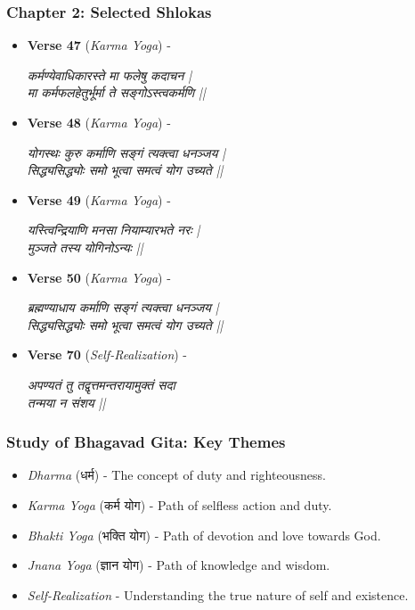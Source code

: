\begin{frame}[fragile]\frametitle{Chapter 2: Selected Shlokas}

      \begin{itemize}
		\item \textbf{Verse 47} (\textit{Karma Yoga}) - 
		
			\textit{कर्मण्येवाधिकारस्ते मा फलेषु कदाचन |} \\
			\textit{मा कर्मफलहेतुर्भूर्मा ते सङ्गोऽस्त्वकर्मणि ||}
		
		\item \textbf{Verse 48} (\textit{Karma Yoga}) - 
		
			\textit{योगस्थः कुरु कर्माणि सङ्गं त्यक्त्वा धनञ्जय |} \\
			\textit{सिद्ध्यसिद्ध्योः समो भूत्वा समत्वं योग उच्यते ||}
		
		\item \textbf{Verse 49} (\textit{Karma Yoga}) - 
		
			\textit{यस्त्विन्द्रियाणि मनसा नियाम्यारभते नरः |} \\
			\textit{मुञ्जते तस्य योगिनोऽन्यः ||}
		
		\item \textbf{Verse 50} (\textit{Karma Yoga}) - 
		
			\textit{ब्रह्मण्याधाय कर्माणि सङ्गं त्यक्त्वा धनञ्जय |} \\
			\textit{सिद्ध्यसिद्ध्योः समो भूत्वा समत्वं योग उच्यते ||}
		
		\item \textbf{Verse 70} (\textit{Self-Realization}) - 
		
			\textit{अपण्यतं तु तद्वृत्तमन्तरायामुक्तं सदा} \\
			\textit{तन्मया न संशय ||}
		
	  \end{itemize}

\end{frame}

\begin{frame}[fragile]\frametitle{Study of Bhagavad Gita: Key Themes}

      \begin{itemize}
		\item \textit{Dharma} (धर्म) - The concept of duty and righteousness.
		\item \textit{Karma Yoga} (कर्म योग) - Path of selfless action and duty.
		\item \textit{Bhakti Yoga} (भक्ति योग) - Path of devotion and love towards God.
		\item \textit{Jnana Yoga} (ज्ञान योग) - Path of knowledge and wisdom.
		\item \textit{Self-Realization} - Understanding the true nature of self and existence.
	  \end{itemize}

\end{frame}



